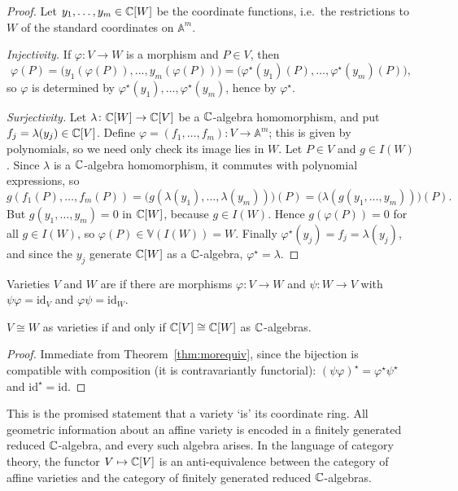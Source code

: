 \documentclass[a4paper]{scrartcl}
\newcommand{\A}{\mathbb{A}}
\newcommand{\V}{\mathbb{V}}
\begin{document}
\begin{proof}
	Let $y_1,\dots,y_m \in \mathbb{C}[W]$ be the coordinate functions, i.e.\ the restrictions to $W$ of the standard coordinates on $\A^m$.

	\emph{Injectivity.} If $\varphi \colon V \to W$ is a morphism and $P \in V$, then
	$$\varphi(P) = \big(y_1(\varphi(P)),\dots,y_m(\varphi(P))\big) = \big(\varphi^\star(y_1)(P),\dots,\varphi^\star(y_m)(P)\big),$$
	so $\varphi$ is determined by $\varphi^\star(y_1),\dots,\varphi^\star(y_m)$, hence by $\varphi^\star$.

	\emph{Surjectivity.} Let $\lambda \colon \mathbb{C}[W] \to \mathbb{C}[V]$ be a $\mathbb{C}$-algebra homomorphism, and put $f_j = \lambda(y_j) \in \mathbb{C}[V]$. Define $\varphi = (f_1,\dots,f_m) \colon V \to \A^m$; this is given by polynomials, so we need only check its image lies in $W$. Let $P \in V$ and $g \in I(W)$. Since $\lambda$ is a $\mathbb{C}$-algebra homomorphism, it commutes with polynomial expressions, so
	$$g(f_1(P),\dots,f_m(P)) = \big(g(\lambda(y_1),\dots,\lambda(y_m))\big)(P) = \big(\lambda(g(y_1,\dots,y_m))\big)(P).$$
	But $g(y_1,\dots,y_m) = 0$ in $\mathbb{C}[W]$, because $g \in I(W)$. Hence $g(\varphi(P)) = 0$ for all $g \in I(W)$, so $\varphi(P) \in \V(I(W)) = W$. Finally $\varphi^\star(y_j) = f_j = \lambda(y_j)$, and since the $y_j$ generate $\mathbb{C}[W]$ as a $\mathbb{C}$-algebra, $\varphi^\star = \lambda$.
\end{proof}

\begin{definition}[Isomorphism]
	Varieties $V$ and $W$ are  if there are morphisms $\varphi \colon V \to W$ and $\psi \colon W \to V$ with $\psi\varphi = \mathrm{id}_V$ and $\varphi\psi = \mathrm{id}_W$.
\end{definition}

\begin{corollary}\label{cor:isocoord}
	$V \cong W$ as varieties if and only if $\mathbb{C}[V] \cong \mathbb{C}[W]$ as $\mathbb{C}$-algebras.
\end{corollary}

\begin{proof}
	Immediate from Theorem~\ref{thm:morequiv}, since the bijection is compatible with composition (it is contravariantly functorial): $(\psi\varphi)^\star = \varphi^\star\psi^\star$ and $\mathrm{id}^\star = \mathrm{id}$.
\end{proof}

This is the promised statement that a variety `is' its coordinate ring. All geometric information about an affine variety is encoded in a finitely generated reduced $\mathbb{C}$-algebra, and every such algebra arises. In the language of category theory, the functor $V \mapsto \mathbb{C}[V]$ is an anti-equivalence between the category of affine varieties and the category of finitely generated reduced $\mathbb{C}$-algebras.
\end{document}
